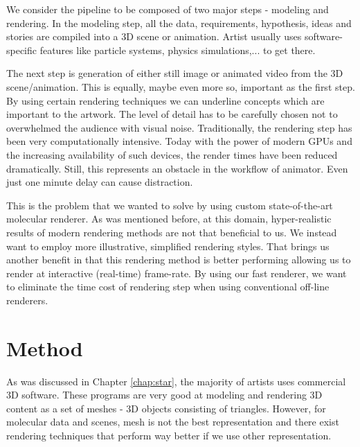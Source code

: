\documentclass[
  digital, %
  table,   %
  nolof,     %
  nolot,     %
]{fithesis3}
\begin{document}
We consider the pipeline to be composed of two major steps - modeling and rendering. In the modeling step, all the data, requirements, hypothesis, ideas and stories are compiled into a 3D scene or animation. Artist usually uses software-specific features like particle systems, physics simulations,... to get there.

The next step is generation of either still image or animated video from the 3D scene/animation. This is equally, maybe even more so, important as the first step. By using certain rendering techniques we can underline concepts which are important to the artwork. The level of detail has to be carefully chosen not to overwhelmed the audience with visual noise. Traditionally, the rendering step has been very computationally intensive. Today with the power of modern GPUs and the increasing availability of such devices, the render times have been reduced dramatically. Still, this represents an obstacle in the workflow of animator. Even just one minute delay can cause distraction.

This is the problem that we wanted to solve by using custom state-of-the-art molecular renderer. As was mentioned before, at this domain, hyper-realistic results of modern rendering methods are not that beneficial to us. We instead want to employ more illustrative, simplified rendering styles. That brings us another benefit in that this rendering method is better performing allowing us to render at interactive (real-time) frame-rate. By using our fast renderer, we want to eliminate the time cost of rendering step when using conventional off-line renderers.

\chapter{Method}
\label{chap:method}

As was discussed in Chapter \ref{chap:star}, the majority of artists uses commercial 3D software. These programs are very good at modeling and rendering 3D content as a set of meshes - 3D objects consisting of triangles. However, for molecular data and scenes, mesh is not the best representation and there exist rendering techniques that perform way better if we use other representation.
\end{document}
